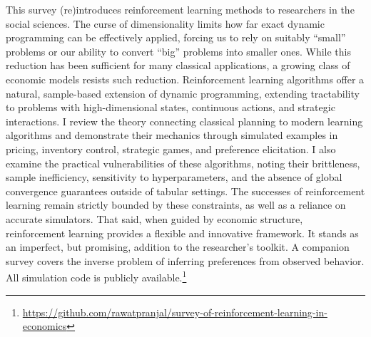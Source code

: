 This survey (re)introduces reinforcement learning methods to researchers in the social sciences. The curse of dimensionality limits how far exact dynamic programming can be effectively applied, forcing us to rely on suitably ``small'' problems or our ability to convert ``big'' problems into smaller ones. While this reduction has been sufficient for many classical applications, a growing class of economic models resists such reduction. Reinforcement learning algorithms offer a natural, sample-based extension of dynamic programming, extending tractability to problems with high-dimensional states, continuous actions, and strategic interactions. I review the theory connecting classical planning to modern learning algorithms and demonstrate their mechanics through simulated examples in pricing, inventory control, strategic games, and preference elicitation. I also examine the practical vulnerabilities of these algorithms, noting their brittleness, sample inefficiency, sensitivity to hyperparameters, and the absence of global convergence guarantees outside of tabular settings. The successes of reinforcement learning remain strictly bounded by these constraints, as well as a reliance on accurate simulators. That said, when guided by economic structure, reinforcement learning provides a flexible and innovative framework. It stands as an imperfect, but promising, addition to the researcher's toolkit. A companion survey \citep{RustRawat2026} covers the inverse problem of inferring preferences from observed behavior. All simulation code is publicly available.\footnote{\url{https://github.com/rawatpranjal/survey-of-reinforcement-learning-in-economics}}
